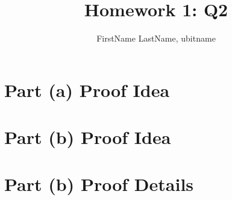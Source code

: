 \documentclass{cse331}
\title{Homework 1: Q2}
\author{FirstName LastName, ubitname}
\begin{document}
\maketitle

\section{Part (a) Proof Idea}


\section{Part (b) Proof Idea}


\section{Part (b) Proof Details}

\end{document}

